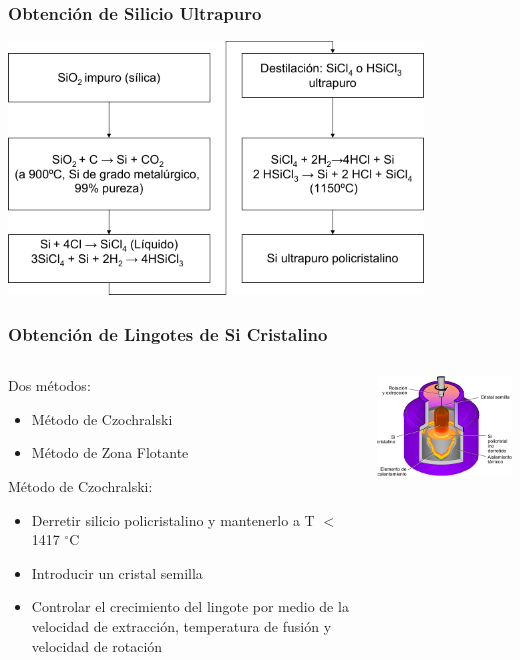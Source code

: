 \documentclass[aspectratio=169,10pt]{beamer}
\begin{document}
\begin{frame}
\frametitle{Obtención de Silicio Ultrapuro}
\centering
\includegraphics[width=11cm]{obleas}
\end{frame}


\begin{frame}
\frametitle{Obtención de Lingotes de Si Cristalino}

\begin{columns}
\begin{column}{0.4\textwidth}
Dos métodos:

\begin{itemize}
	\item Método de Czochralski
	\item Método de Zona Flotante
\end{itemize}
	
\vspace{5mm}
Método de Czochralski:

\begin{itemize}
	\item Derretir silicio policristalino y mantenerlo a T $<$ 1417 $^\circ$C
	\item Introducir un cristal semilla
	\item Controlar el crecimiento del lingote por medio de la velocidad de extracción, temperatura de fusión y velocidad de rotación	
\end{itemize}
\end{column}
\begin{column}{0.5\textwidth}
	\centering
	\includegraphics[width=8cm]{czochralski}
\end{column}
\end{columns}
\end{frame}
\end{document}
